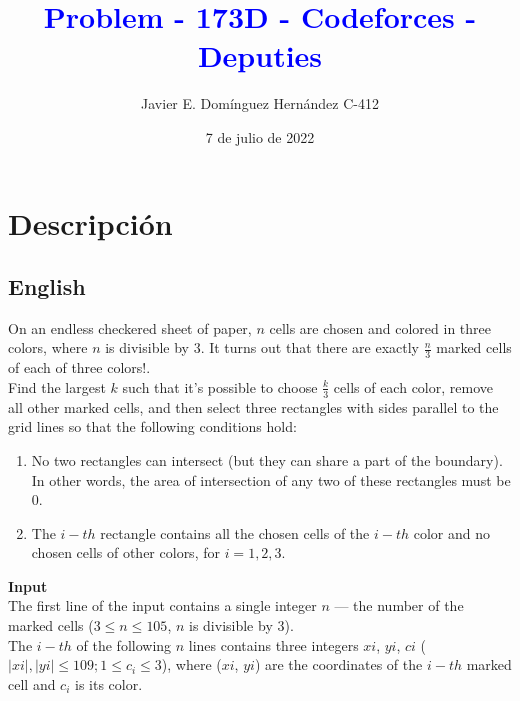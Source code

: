 \documentclass[12pt, a4paper]{article}
\begin{document}
    \title{\textcolor{blue}{\huge\textbf{Problem - 173D - Codeforces - Deputies}}\\}
	\author{\large{Javier E. Domínguez Hernández C-412}}  
    \date{7 de julio de 2022}
    \maketitle

	\section{Descripción}

	\subsection{English}
		On an endless checkered sheet of paper, $n$ cells are chosen and colored in three colors, where $n$ is divisible by $3$. It turns out that there are exactly $\frac{n}{3}$ marked cells of each of three colors!.\\

		Find the largest $k$ such that it's possible to choose $\frac{k}{3}$ cells of each color, remove all other marked cells, and then select three rectangles with sides parallel to the grid lines so that the following conditions hold:\\

		\begin{enumerate}
			\item No two rectangles can intersect (but they can share a part of the boundary). In other words, the area of intersection of any two of these rectangles must be $0$.\\

			\item The $i-th$ rectangle contains all the chosen cells of the $i-th$ color and no chosen cells of other colors, for $i=1, 2, 3$.\\
		\end{enumerate}		

		{\bf Input}\\

		The first line of the input contains a single integer $n$ — the number of the marked cells ($3 \le n \le 105$, $n$ is divisible by $3$).\\

		The $i-th$ of the following $n$ lines contains three integers $xi$, $yi$, $ci$ ($|xi|, |yi| \le 109; 1 \le c_i \le 3$), where ($xi$, $yi$) are the coordinates of the $i-th$ marked cell and $c_i$ is its color.\\
\end{document}
